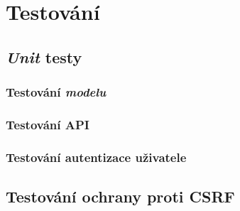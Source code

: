 \chapter{Testování}
\label{sec:te}

\section{\textit{Unit} testy}


\subsection{Testování \textit{modelu}}

\subsection{Testování API}

\subsection{Testování autentizace uživatele}


\section{Testování ochrany proti CSRF}

